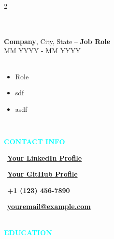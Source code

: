 \documentclass{article}
\begin{document}
\begin{multicols}{2}
\begin{minipage}{200pt}
\begin{itemize}
        \end{itemize}
    \end{minipage}
    \\
    \vspace{20pt}
    \\
    \textbf{\fontsize{14}{24}\selectfont Company}, City, State -- \textbf{\fontsize{14}{24}\selectfont Job Role}\\
    MM YYYY - MM YYYY \\
    \vspace{1pt}
    \\
    \begin{minipage}{200pt}
        \begin{itemize}
            \setlength\itemsep{0.001em} %
            \setlength\parsep{0.001em} %
            \item Role 
            \item sdf 
            \item asdf
        \end{itemize}
    \end{minipage}
    \\
    \columnbreak %
    \begin{tcolorbox}[colback=gray!20, boxrule=0pt, height=\textheight - 60pt, left=20pt, right=20pt]
    \vspace{5pt}
    \textbf{\fontsize{16}{24}\selectfont\textcolor{cyan} {CONTACT INFO}}
    
    \vspace{10pt}
        \begin{minipage}{200pt}
            \faLinkedinSquare\, \textbf{\href{https://www.linkedin.com/in/your-profile} {Your LinkedIn Profile}}
    
            \faGithub\, \textbf{\href{https://www.linkedin.com/in/your-profile} {Your GitHub Profile}}
            
            \faPhone\, \textbf{+1 (123) 456-7890}
            
            \faEnvelopeO\, \textbf{\href{mailto:youremail@example.com}{youremail@example.com}}
                    
        \end{minipage}
    \hfill
    \vspace{20pt}
    \\
    \textbf{\fontsize{16}{24}\selectfont\textcolor{cyan} {EDUCATION}}
    

\end{tcolorbox}
\end{multicols}
\end{document}
